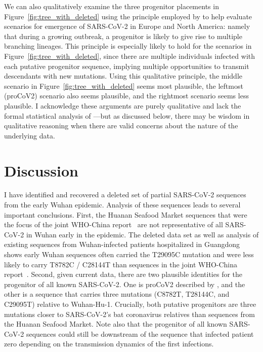 \documentclass[9pt,twocolumn,twoside]{gsajnl_modified}
\begin{document}
We can also qualitatively examine the three progenitor placements in Figure~\ref{fig:tree_with_deleted} using the principle employed by \citet{worobey2020emergence} to help evaluate scenarios for emergence of SARS-CoV-2 in Europe and North America: namely that during a growing outbreak, a progenitor is likely to give rise to multiple branching lineages.
This principle is especially likely to hold for the scenarios in Figure~\ref{fig:tree_with_deleted}, since there are multiple individuals infected with each putative progenitor sequence, implying multiple opportunities to transmit descendants with new mutations.
Using this qualitative principle, the middle scenario in Figure~\ref{fig:tree_with_deleted} seems most plausible, the leftmost (proCoV2) scenario also seems plausible, and the rightmost scenario seems less plausible.
I acknowledge these arguments are purely qualitative and lack the formal statistical analysis of \citet{worobey2020emergence}---but as discussed below, there may be wisdom in qualitative reasoning when there are valid concerns about the nature of the underlying data.

\section{Discussion}
I have identified and recovered a deleted set of partial SARS-CoV-2 sequences from the early Wuhan epidemic.
Analysis of these sequences leads to several important conclusions.
First, the Huanan Seafood Market sequences that were the focus of the joint WHO-China report~\citep{WHO2021origins} are not representative of all SARS-CoV-2 in Wuhan early in the epidemic.
The deleted data set as well as analysis of existing sequences from Wuhan-infected patients hospitalized in Guangdong shows early Wuhan sequences often carried the T29095C mutation and were less likely to carry T8782C / C28144T than sequences in the joint WHO-China report~\citep{WHO2021origins}.
Second, given current data, there are two plausible identities for the progenitor of all known SARS-CoV-2.
One is proCoV2 described by \citet{kumar2021evolutionary}, and the other is a sequence that carries three mutations (C8782T, T28144C, and C29095T) relative to Wuhan-Hu-1.
Crucially, both putative progenitors are three mutations closer to SARS-CoV-2's bat coronavirus relatives than sequences from the Huanan Seafood Market.
Note also that the progenitor of all known SARS-CoV-2 sequences could still be downstream of the sequence that infected patient zero depending on the transmission dynamics of the first infections.
\end{document}

